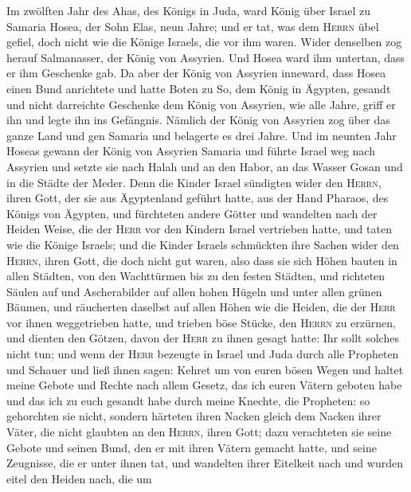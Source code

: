  Im zwölften Jahr des Ahas, des Königs in Juda, ward König
über Israel zu Samaria Hosea, der Sohn Elas, neun Jahre; 
und er tat, was dem \textsc{Herrn} übel gefiel, doch nicht wie die
Könige Israels, die vor ihm waren.  Wider denselben zog
herauf Salmanasser, der König von Assyrien. Und Hosea ward ihm untertan,
dass er ihm Geschenke gab.  Da aber der König von Assyrien
inneward, dass Hosea einen Bund anrichtete und hatte Boten zu So, dem
König in Ägypten, gesandt und nicht darreichte Geschenke dem König von
Assyrien, wie alle Jahre, griff er ihn und legte ihn ins Gefängnis.
 Nämlich der König von Assyrien zog über das ganze Land
und gen Samaria und belagerte es drei Jahre.  Und im
neunten Jahr Hoseas gewann der König von Assyrien Samaria und führte
Israel weg nach Assyrien und setzte sie nach Halah und an den Habor, an
das Wasser Gosan und in die Städte der Meder.  Denn die
Kinder Israel sündigten wider den \textsc{Herrn}, ihren Gott, der sie
aus Ägyptenland geführt hatte, aus der Hand Pharaos, des Königs von
Ägypten, und fürchteten andere Götter  und wandelten nach
der Heiden Weise, die der \textsc{Herr} vor den Kindern Israel
vertrieben hatte, und taten wie die Könige Israels;  und
die Kinder Israels schmückten ihre Sachen wider den \textsc{Herrn},
ihren Gott, die doch nicht gut waren, also dass sie sich Höhen bauten in
allen Städten, von den Wachttürmen bis zu den festen Städten,
 und richteten Säulen auf und Ascherabilder auf allen
hohen Hügeln und unter allen grünen Bäumen,  und
räucherten daselbst auf allen Höhen wie die Heiden, die der
\textsc{Herr} vor ihnen weggetrieben hatte, und trieben böse Stücke, den
\textsc{Herrn} zu erzürnen,  und dienten den Götzen,
davon der \textsc{Herr} zu ihnen gesagt hatte: Ihr sollt solches nicht
tun;  und wenn der \textsc{Herr} bezeugte in Israel und
Juda durch alle Propheten und Schauer und ließ ihnen sagen: Kehret um
von euren bösen Wegen und haltet meine Gebote und Rechte nach allem
Gesetz, das ich euren Vätern geboten habe und das ich zu euch gesandt
habe durch meine Knechte, die Propheten:  so gehorchten
sie nicht, sondern härteten ihren Nacken gleich dem Nacken ihrer Väter,
die nicht glaubten an den \textsc{Herrn}, ihren Gott; 
dazu verachteten sie seine Gebote und seinen Bund, den er mit ihren
Vätern gemacht hatte, und seine Zeugnisse, die er unter ihnen tat, und
wandelten ihrer Eitelkeit nach und wurden eitel den Heiden nach, die um
